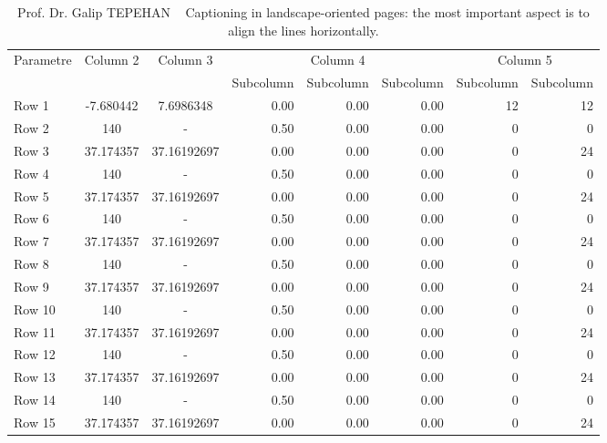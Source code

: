 
\begin{landscape}
	\thispagestyle{empty}
	
	\begin{table}
		{\setlength{\tabcolsep}{14pt}
			\caption{Prof. Dr. Galip TEPEHAN  \,\,\, Captioning in landscape-oriented pages:
				the most important aspect is to align the lines horizontally.}
			\begin{center}
				\vspace{-6mm}
				\begin{tabular}{lccrrrrr}
					\hline\hline
					\multirow{2}{*}{Parametre} & \multirow{2}{*}{Column 2} & \multirow{2}{*}{Column 3} & \multicolumn{3}{c|}{Column 4} & \multicolumn{2}{c}{Column 5}\\ \cline{4-8}
					& & & Subcolumn & Subcolumn & Subcolumn & Subcolumn & Subcolumn\\
					\hline
					Row 1 & -7.680442 & 7.6986348 & 0.00 & 0.00 & 0.00 & 12 & 12 \\
					Row 2 & 140 & - & 0.50 & 0.00 & 0.00 & 0 & 0 \\
					Row 3 & 37.174357 & 37.16192697 & 0.00 & 0.00 & 0.00 & 0 & 24 \\
					Row 4 & 140 & - & 0.50 & 0.00 & 0.00 & 0 & 0 \\
					Row 5 & 37.174357 & 37.16192697 & 0.00 & 0.00 & 0.00 & 0 & 24 \\
					Row 6 & 140 & - & 0.50 & 0.00 & 0.00 & 0 & 0 \\
					Row 7 & 37.174357 & 37.16192697 & 0.00 & 0.00 & 0.00 & 0 & 24 \\
					Row 8 & 140 & - & 0.50 & 0.00 & 0.00 & 0 & 0 \\
					Row 9 & 37.174357 & 37.16192697 & 0.00 & 0.00 & 0.00 & 0 & 24 \\
					Row 10 & 140 & - & 0.50 & 0.00 & 0.00 & 0 & 0 \\
					Row 11 & 37.174357 & 37.16192697 & 0.00 & 0.00 & 0.00 & 0 & 24 \\
					Row 12 & 140 & - & 0.50 & 0.00 & 0.00 & 0 & 0 \\
					Row 13 & 37.174357 & 37.16192697 & 0.00 & 0.00 & 0.00 & 0 & 24 \\
					Row 14 & 140 & - & 0.50 & 0.00 & 0.00 & 0 & 0 \\
					Row 15 & 37.174357 & 37.16192697 & 0.00 & 0.00 & 0.00 & 0 & 24 \\
				\end{tabular}
			\end{center}
			\begin{center}
				\vspace{3cm}
				\hspace{0cm}\pageref{table:galip}
				\label{table:galip}
			\end{center}
		}
	\end{table}
	
\end{landscape}